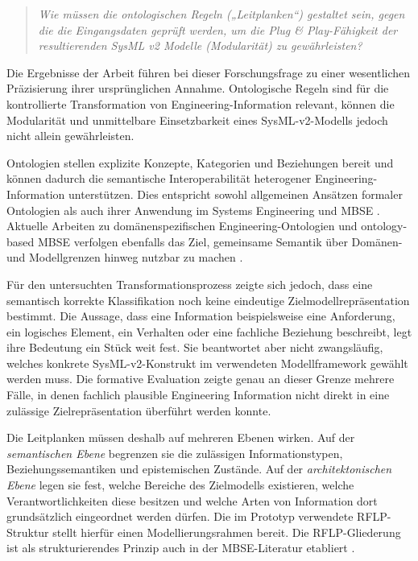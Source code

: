 \begin{quote}
\textit{Wie müssen die ontologischen Regeln („Leitplanken“) gestaltet sein,
gegen die die Eingangsdaten geprüft werden, um die Plug \& Play-Fähigkeit der
resultierenden SysML v2 Modelle (Modularität) zu gewährleisten?}
\end{quote}

Die Ergebnisse der Arbeit führen bei dieser Forschungsfrage zu einer
wesentlichen Präzisierung ihrer ursprünglichen Annahme. Ontologische Regeln
sind für die kontrollierte Transformation von Engineering-Information
relevant, können die Modularität und unmittelbare Einsetzbarkeit eines
SysML-v2-Modells jedoch nicht allein gewährleisten.

Ontologien stellen explizite Konzepte, Kategorien und Beziehungen bereit und
können dadurch die semantische Interoperabilität heterogener
Engineering-Information unterstützen. Dies entspricht sowohl allgemeinen
Ansätzen formaler Ontologien als auch ihrer Anwendung im Systems Engineering
und MBSE \cite{ISO21838_2_2021,OrellanaMandrick2019,Lu2022}.
Aktuelle Arbeiten zu domänenspezifischen Engineering-Ontologien und
ontology-based MBSE verfolgen ebenfalls das Ziel, gemeinsame Semantik über
Domänen- und Modellgrenzen hinweg nutzbar zu machen
\cite{Liu2025SysDO,Dong2026,Kulvatunyou2022}.

Für den untersuchten Transformationsprozess zeigte sich jedoch, dass eine
semantisch korrekte Klassifikation noch keine eindeutige
Zielmodellrepräsentation bestimmt. Die Aussage, dass eine Information
beispielsweise eine Anforderung, ein logisches Element, ein Verhalten oder
eine fachliche Beziehung beschreibt, legt ihre Bedeutung ein Stück weit fest.
Sie beantwortet aber nicht zwangsläufig, welches konkrete SysML-v2-Konstrukt
im verwendeten Modellframework gewählt werden muss. Die formative Evaluation
zeigte genau an dieser Grenze mehrere Fälle, in denen fachlich plausible
Engineering Information nicht direkt in eine zulässige Zielrepräsentation
überführt werden konnte.

Die Leitplanken müssen deshalb auf mehreren Ebenen wirken. Auf der
\emph{semantischen Ebene} begrenzen sie die zulässigen Informationstypen,
Beziehungssemantiken und epistemischen Zustände. Auf der
\emph{architektonischen Ebene} legen sie fest, welche Bereiche des
Zielmodells existieren, welche Verantwortlichkeiten diese besitzen und welche
Arten von Information dort grundsätzlich eingeordnet werden dürfen.
Die im Prototyp verwendete RFLP-Struktur stellt hierfür einen
Modellierungsrahmen bereit. Die RFLP-Gliederung ist als strukturierendes
Prinzip auch in der MBSE-Literatur etabliert
\cite{LiLockettLawson2020}.

